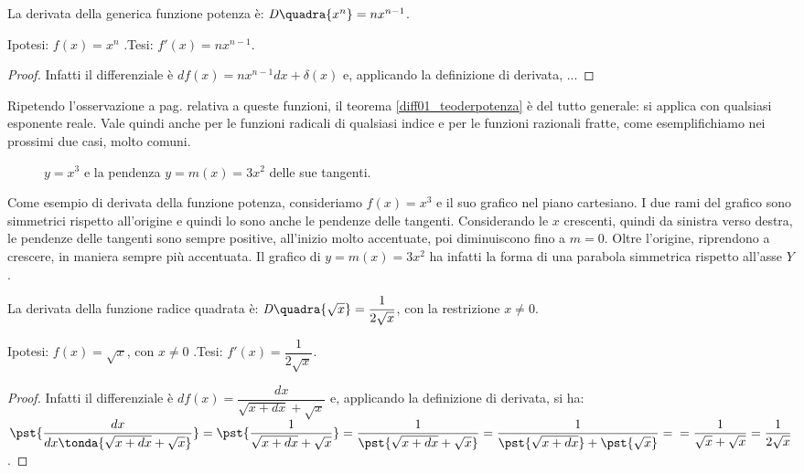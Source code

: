 \begin{teorema}
  \label{diff01_teoderpotenza}
  La derivata della generica funzione potenza è: $\mathit{D}\quadra{x^n}=
  nx^{n-1}$.
\end{teorema}
\noindent Ipotesi: $f(x)=x^n$ .\tab Tesi: $f'(x)=nx^{n-1}$.
\begin{proof}
  Infatti il differenziale è $df(x)=nx^{n-1}dx+ \delta(x)$ e,
  applicando la definizione di derivata, ...
\end{proof}

\begin{osservazione}
 Ripetendo l'osservazione a pag.\pageref{subsubsec:diff01_diffpot} relativa 
 a queste funzioni, il teorema \ref{diff01_teoderpotenza} è del tutto generale: si
 applica con qualsiasi esponente reale.
Vale quindi anche per le funzioni radicali di qualsiasi indice e per le funzioni
razionali fratte, come esemplifichiamo nei prossimi due casi, molto comuni.
\end{osservazione}

\begin{figure}[h!]
\begin{inaccessibleblock}
 \begin{center}
 \begin{minipage}[]{.48\textwidth}
 \cubica
 \end{minipage} 
 \hfill
 \begin{minipage}[]{.48\textwidth}
  \tangenticubica
 \end{minipage}
 \end{center}
\end{inaccessibleblock}
\caption{$y=x^3$ e la pendenza $y=m(x)=3x^2$ delle sue tangenti.} 
\label{}
\end{figure}
Come esempio di derivata della funzione potenza, consideriamo $f(x)=x^3$
e il suo grafico nel piano cartesiano. I due rami del grafico sono simmetrici
rispetto all'origine e quindi lo sono anche le pendenze delle tangenti. 
Considerando le $x$ crescenti, quindi da sinistra verso destra, le pendenze 
delle tangenti sono sempre positive, all'inizio molto accentuate, poi diminuiscono
fino a $m=0$. Oltre l'origine, riprendono a crescere, in maniera sempre più 
accentuata. Il grafico di $y=m(x)=3 x^2$ ha infatti la forma di una parabola
simmetrica rispetto all'asse $Y$.

\begin{corollario}
  La derivata della funzione radice quadrata è: $\mathit{D}\quadra{\sqrt{x}}=
    \dfrac{1}{2\sqrt{x}}$, con la restrizione $x\ne 0$.
\end{corollario}
\noindent Ipotesi: $f(x)=\sqrt{x}$, con $x\ne 0$ .\tab Tesi: 
    $f'(x)=\dfrac{1}{2\sqrt{x}}$.
\begin{proof}
  Infatti il differenziale è $df(x)=\dfrac{dx}{\sqrt{x+dx}+\sqrt{x}}$ e,
  applicando la definizione di derivata, si ha:\\
  $\pst{\dfrac{dx}{dx\tonda{\sqrt{x+dx}+\sqrt{x}}}}=
  \pst{\dfrac{1}{\sqrt{x+dx}+\sqrt{x}}}=
      \dfrac{1}{\pst{\sqrt{x+dx}+\sqrt{x}}}=
      \dfrac{1}{\pst{\sqrt{x+dx}}+\pst{\sqrt{x}}}=\\
      =\dfrac{1}{\sqrt{x}+\sqrt{x}}=\dfrac{1}{2\sqrt{x}}$.
\end{proof}

